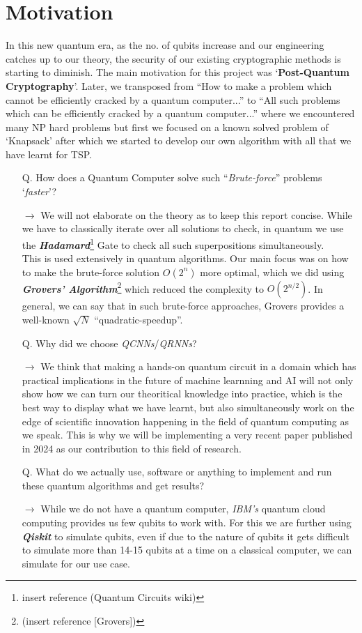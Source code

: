 \documentclass[a4paper]{article}
\begin{document}
\section*{Motivation}
In this new quantum era, as the no. of qubits increase and our engineering catches up to our theory, the security of our existing cryptographic methods is starting to diminish. The main motivation for this project was `\textbf{Post-Quantum Cryptography}'. Later, we transposed from ``How to make a problem which cannot be efficiently cracked by a quantum computer...'' to ``All such problems which can be efficiently cracked by a quantum computer...'' where we encountered many NP hard problems but first we focused on a known solved problem of `Knapsack' after which we started to develop our own algorithm with all that we have learnt for TSP.
\begin{itemize}
\item[Q.] How does a Quantum Computer solve such ``\emph{Brute-force}'' problems `\emph{faster}'?
\item[\textbf{$\rightarrow$}] We will not elaborate on the theory as to keep this report concise. While we have to classically iterate over all solutions to check, in quantum we use the \textbf{\emph{Hadamard}}\footnote{insert reference (Quantum Circuits wiki)} Gate to check all such superpositions simultaneously.\vspace{5pt}\\
This is used extensively in quantum algorithms. Our main focus was on how to make the brute-force solution $O(2^{n})$ more optimal, which we did using \emph{\textbf{Grovers' Algorithm}}\footnote{(insert reference [Grovers])} which reduced the complexity to $O(2^{n/2})$. In general, we can say that in such brute-force approaches, Grovers provides a well-known $\sqrt{N}$ ``quadratic-speedup''.

\item[Q.] Why did we choose \emph{QCNNs}/\emph{QRNNs}?
\item[\textbf{$\rightarrow$}] We think that making a hands-on quantum circuit in a domain which has practical implications in the future of machine learnning and AI will not only show how we can turn our theoritical knowledge into practice, which is the best way to display what we have learnt, but also simultaneously work on the edge of scientific innovation happening in the field of quantum computing as we speak. This is why we will be implementing a very recent paper published in 2024 as our contribution to this field of research.

\item[Q.] What do we actually use, software or anything to implement and run these quantum algorithms and get results?
\item[\textbf{$\rightarrow$}] While we do not have a quantum computer,  \emph{IBM's} quantum cloud computing provides us few qubits to work with. For this we are further using \textbf{\emph{Qiskit}} to simulate qubits, even if due to the nature of qubits it gets difficult to simulate more than 14-15 qubits at a time on a classical computer, we can simulate for our use case.
\end{itemize}
\end{document}
